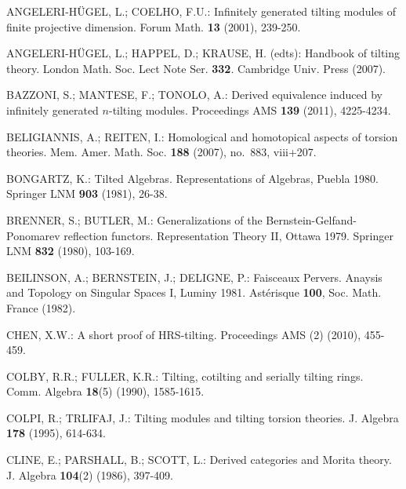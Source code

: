 \documentclass{proc-l}
\theoremstyle{definition}
\theoremstyle{remark}
\numberwithin{equation}{section}
\begin{document}
%

\begin{thebibliography}{99}

 {\sc ANGELERI-H\"UGEL, L.; COELHO, F.U.}: Infinitely generated tilting modules of finite projective dimension. Forum Math. \textbf{13} (2001), 239-250. 

 {\sc ANGELERI-H\"UGEL, L.; HAPPEL, D.; KRAUSE, H. (edts)}: Handbook of tilting theory. London Math. Soc. Lect Note Ser. \textbf{332}. Cambridge Univ. Press (2007). 

 {\sc BAZZONI, S.; MANTESE, F.; TONOLO, A.}: Derived equivalence induced by infinitely generated $n$-tilting modules. Proceedings AMS \textbf{139} (2011), 4225-4234.

 {\sc BELIGIANNIS, A.; REITEN, I.}: Homological and homotopical aspects of torsion theories. Mem. Amer. Math. Soc. \textbf{188} (2007),
  no.~883, viii+207.

 {\sc BONGARTZ, K.}: Tilted Algebras. Representations of Algebras, Puebla 1980. Springer LNM \textbf{903}  (1981), 26-38.

 {\sc BRENNER, S.; BUTLER, M.}: Generalizations of the Bernstein-Gelfand-Ponomarev reflection functors. Representation Theory II, Ottawa 1979. Springer LNM \textbf{832} (1980), 103-169.

 {\sc BEILINSON, A.; BERNSTEIN, J.; DELIGNE, P.}: Faisceaux Pervers. Anaysis and Topology on Singular Spaces I, Luminy 1981. Ast\'erisque \textbf{100}, Soc. Math. France (1982).

 {\sc CHEN, X.W.}: A short proof of HRS-tilting. Proceedings AMS (2) (2010), 455-459.

 {\sc COLBY, R.R.; FULLER, K.R.}: Tilting, cotilting and serially tilting rings. Comm. Algebra \textbf{18}(5) (1990), 1585-1615.

 {\sc COLPI, R.; TRLIFAJ, J.}: Tilting modules and tilting torsion theories. J. Algebra \textbf{178} (1995), 614-634. 

 {\sc CLINE, E.; PARSHALL, B.; SCOTT, L.}: Derived categories and Morita theory. J. Algebra \textbf{104}(2) (1986), 397-409.


\end{thebibliography}
\end{document}
